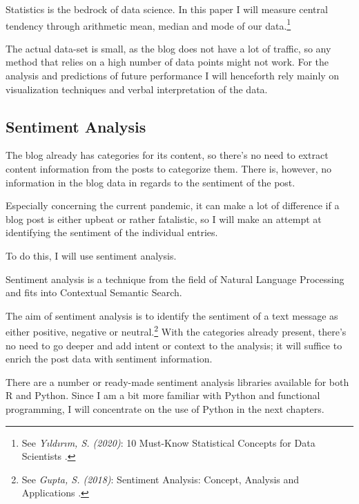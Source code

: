 Statistics is the bedrock of data science. In this paper I will measure central tendency through arithmetic mean, median and mode of our data.\footnote{See \textit{Yıldırım, S. (2020)}: 10 Must-Know Statistical Concepts for Data Scientists .\cite{bedrockScience}}

The actual data-set is small, as the blog does not have a lot of traffic, so any method that relies on a high number of data points might not work. For the analysis and predictions of future performance I will henceforth rely mainly on visualization techniques and verbal interpretation of the data.

\subsection{Sentiment Analysis}

The blog already has categories for its content, so there's no need to extract content information from the posts to categorize them. There is, however, no information in the blog data in regards to the sentiment of the post.

Especially concerning the current pandemic, it can make a lot of difference if a blog post is either upbeat or rather fatalistic, so I will make an attempt at identifying the sentiment of the individual entries.

To do this, I will use sentiment analysis. 

Sentiment analysis is a technique from the field of Natural Language Processing and fits into Contextual Semantic Search. 

The aim of sentiment analysis is to identify the sentiment of a text message as either positive, negative or neutral.\footnote{See \textit{Gupta, S. (2018)}: Sentiment Analysis: Concept, Analysis and Applications .\cite{sentimentAnalysis}} With the categories already present, there's no need to go deeper and add intent or context to the analysis; it will suffice to enrich the post data with sentiment information.

There are a number or ready-made sentiment analysis libraries available for both R and Python. Since I am a bit more familiar with Python and functional programming, I will concentrate on the use of Python in the next chapters.
